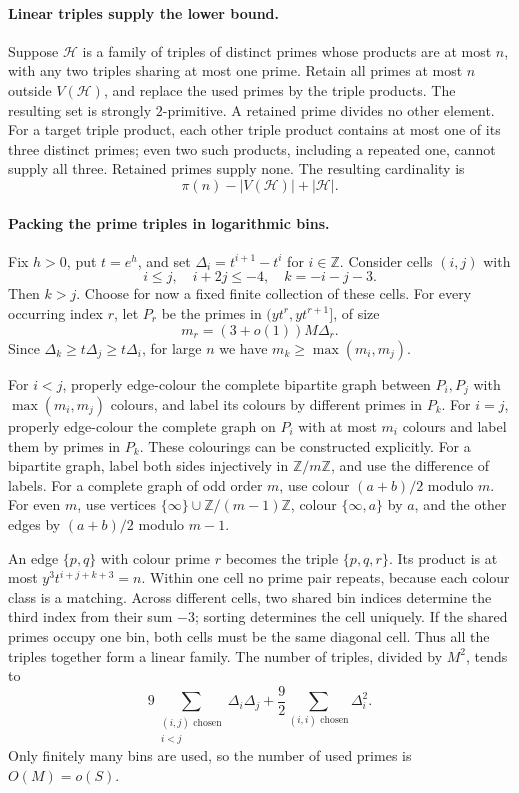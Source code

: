 \paragraph{Linear triples supply the lower bound.}
Suppose \(\mathcal H\) is a family of triples of distinct
primes whose products are at most \(n\), with any two
triples sharing at most one prime.
Retain all primes at most \(n\) outside \(V(\mathcal H)\),
and replace the used primes by the triple products.
The resulting set is strongly \(2\)-primitive.
A retained prime divides no other element.
For a target triple product, each other triple product
contains at most one of its three distinct primes;
even two such products, including a repeated one, cannot
supply all three. Retained primes supply none.
The resulting cardinality is
\[
 \pi(n)-|V(\mathcal H)|+|\mathcal H|.                           \tag{6}
\]

\paragraph{Packing the prime triples in logarithmic bins.}
Fix \(h>0\), put \(t=e^h\), and set
\(\Delta_i=t^{i+1}-t^i\) for \(i\in\mathbb Z\).
Consider cells \((i,j)\) with
\[
 i\leq j,\quad i+2j\leq-4,\quad k=-i-j-3.
\]
Then \(k>j\).
Choose for now a fixed finite collection of these cells.
For every occurring index \(r\), let \(P_r\) be the primes
in \((yt^r,yt^{r+1}]\), of size
\[
 m_r=(3+o(1))M\Delta_r.
\]
Since \(\Delta_k\geq t\Delta_j\geq t\Delta_i\), for large
\(n\) we have \(m_k\geq\max(m_i,m_j)\).

For \(i<j\), properly edge-colour the complete bipartite
graph between \(P_i,P_j\) with \(\max(m_i,m_j)\) colours,
and label its colours by different primes in \(P_k\).
For \(i=j\), properly edge-colour the complete graph on
\(P_i\) with at most \(m_i\) colours and label them by primes
in \(P_k\).
These colourings can be constructed explicitly.
For a bipartite graph, label both sides injectively in
\(\mathbb Z/m\mathbb Z\), and use the difference of labels.
For a complete graph of odd order \(m\), use colour
\((a+b)/2\) modulo \(m\).
For even \(m\), use vertices
\(\{\infty\}\cup\mathbb Z/(m-1)\mathbb Z\), colour
\(\{\infty,a\}\) by \(a\), and the other edges by
\((a+b)/2\) modulo \(m-1\).

An edge \(\{p,q\}\) with colour prime \(r\) becomes the
triple \(\{p,q,r\}\).
Its product is at most
\(y^3t^{i+j+k+3}=n\).
Within one cell no prime pair repeats, because each colour
class is a matching.
Across different cells, two shared bin indices determine
the third index from their sum \(-3\); sorting determines
the cell uniquely. If the shared primes occupy one bin,
both cells must be the same diagonal cell.
Thus all the triples together form a linear family.
The number of triples, divided by \(M^2\), tends to
\[
 9\sum_{\substack{(i,j)\text{ chosen}\\i<j}}\Delta_i\Delta_j
 +\frac92\sum_{(i,i)\text{ chosen}}\Delta_i^2.                  \tag{7}
\]
Only finitely many bins are used, so the number of used
primes is \(O(M)=o(S)\).

